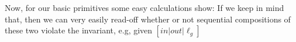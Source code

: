 Now, for our basic primitives some easy calculations show:
If we keep in mind that,
then we can very easily read-off whether or not sequential compositions
of these two violate the invariant, e.g, given $[in|out|\ell_g]$
